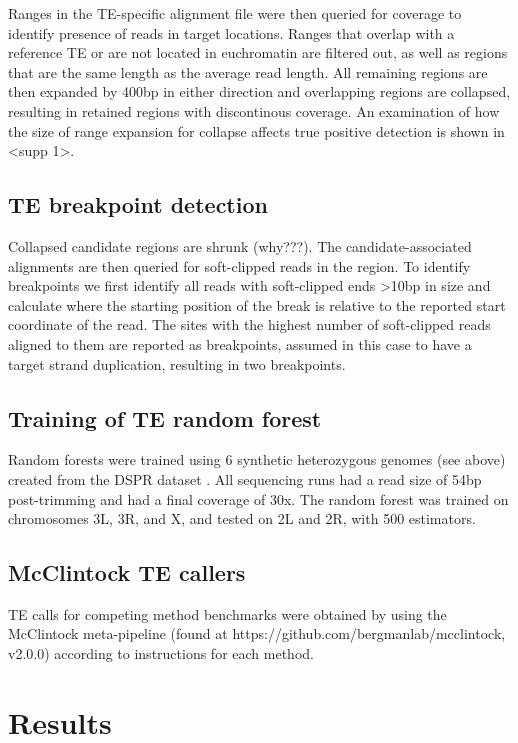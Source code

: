 Ranges in the TE-specific alignment file were then queried for coverage to identify presence of reads in target locations. Ranges that overlap with a reference TE or are not located in euchromatin are filtered out, as well as  regions that are the same length as the average read length. All remaining regions are then expanded by 400bp in either direction and overlapping regions are collapsed, resulting in retained regions with discontinous coverage. An examination of how the size of range expansion for collapse affects true positive detection is shown in <supp 1>. 

\subsection{TE breakpoint detection}

Collapsed candidate regions are shrunk (why???). The candidate-associated alignments are then queried for soft-clipped reads in the region. To identify breakpoints we first identify all reads with soft-clipped ends >10bp in size and calculate where the starting position of the break is relative to the reported start coordinate of the read. The sites with the highest number of soft-clipped reads aligned to them are reported as breakpoints, assumed in this case to have a target strand duplication, resulting in two breakpoints.

\subsection{Training of TE random forest}

Random forests were trained using 6 synthetic heterozygous genomes (see above) created from the DSPR dataset \cite{chakrabortyStructuralVariantsExhibit2019}. All sequencing runs had a read size of 54bp post-trimming and had a final coverage of 30x. The random forest was trained on chromosomes 3L, 3R, and X, and tested on 2L and 2R, with 500 estimators.

\subsection{McClintock TE callers}

TE calls for competing method benchmarks were obtained by using the McClintock meta-pipeline (found at https://github.com/bergmanlab/mcclintock, v2.0.0) according to instructions for each method.

\section{Results}

